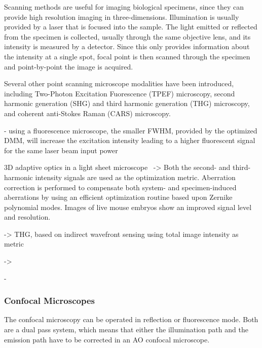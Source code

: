 Scanning methods are useful for imaging biological specimens, since they can provide high resolution imaging in three-dimensions. Illumination is  usually provided by a laser that is focused into the sample. The light emitted or reflected from the specimen is collected, usually through the same objective lens, and its intensity is measured by a detector. Since this only provides information about the intensity at a single spot, focal point is then scanned through the specimen and point-by-point the image is acquired. 

Several other point scanning microscope modalities have been introduced, including Two-Photon Excitation Fuorescence (TPEF) microscopy, second harmonic generation (SHG) and third harmonic generation (THG) microscopy, and coherent anti-Stokes Raman (CARS) microscopy.

- using a fluorescence microscope, the smaller FWHM, provided by the optimized DMM, will increase the excitation intensity leading to a higher fluorescent signal for the same laser beam input power

3D adaptive optics in a light sheet microscope~\cite{scan_lightSheet}
\cite{scan_HG_embryos} -> Both the second- and third-harmonic intensity signals are used as the optimization metric. Aberration correction is performed to compensate both system- and specimen-induced aberrations by using an efficient optimization routine based upon Zernike polynomial modes. Images of live mouse embryos show an improved signal level and resolution.

\cite{scan_HG_dynamic} -> THG, based on indirect wavefront sensing using total image intensity as metric

\cite{scan_CARS} -> 

\cite{scan_STED}


-
\subsubsection{Confocal Microscopes}
\label{sec:ConfocalMicroscopes}

The confocal microscopy can be operated in reflection or fluorescence mode. Both are a dual pass system, which means that either the illumination path and the emission path have to be corrected in an AO confocal microscope. 

